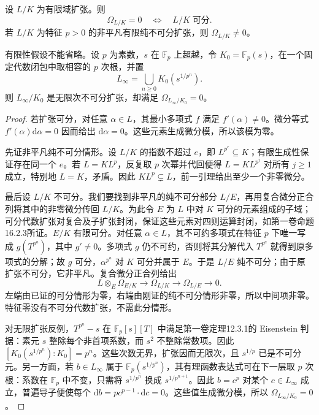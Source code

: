 \begin{theorem}\label{b3:thm:finite-field-differentials-separable}
	设 \(L/K\) 为有限域扩张。则
	\[
		\Omega_{L/K}=0\quad\Longleftrightarrow\quad L/K\;\text{可分}.
	\]
	若 \(L/K\) 为特征 \(p>0\) 的非平凡有限纯不可分扩张，则 \(\Omega_{L/K}\ne0\)。

	有限性假设不能省略。设 \(p\) 为素数，\(s\) 在 \(\mathbb F_p\) 上超越，令 \(K_0=\mathbb F_p(s)\)，在一个固定代数闭包中取相容的 \(p\) 次根，并置
	\[
		L_\infty=\bigcup_{n\ge0}K_0(s^{1/p^n}).
	\]
	则 \(L_\infty/K_0\) 是无限次不可分扩张，却满足 \(\Omega_{L_\infty/K_0}=0\)。
\end{theorem}
\begin{proof}
	若扩张可分，对任意 \(\alpha\in L\)，其最小多项式 \(f\) 满足 \(f'(\alpha)\ne0\)。微分等式 \(f'(\alpha)\mathrm{d}\alpha=0\) 因而给出 \(\mathrm{d}\alpha=0\)。这些元素生成微分模，所以该模为零。

	先证非平凡纯不可分情形。设 \(L/K\) 的指数不超过 \(e\)，即 \(L^{p^e}\subseteq K\)；有限生成性保证存在同一个 \(e\)。若 \(L=K L^p\)，反复取 \(p\) 次幂并代回便得 \(L=K L^{p^j}\) 对所有 \(j\ge1\) 成立，特别地 \(L=K\)，矛盾。因此 \(K L^p\subsetneq L\)，前一引理给出至少一个非零微分。

	最后设 \(L/K\) 不可分。我们要找到非平凡的纯不可分部分 \(L/E\)，再用复合微分正合列将其中的非零微分传回 \(L/K\)。为此令 \(E\) 为 \(L\) 中对 \(K\) 可分的元素组成的子域；可分代数扩张对复合及子扩张封闭，保证这些元素对四则运算封闭，如第一卷命题16.2.3所证。\(E/K\) 有限可分。对任意 \(\alpha\in L\)，其不可约多项式在特征 \(p\) 下唯一写成 \(g(T^{p^a})\)，其中 \(g'\ne0\)。多项式 \(g\) 仍不可约，否则将其分解代入 \(T^{p^a}\) 就得到原多项式的分解；故 \(g\) 可分，\(\alpha^{p^a}\) 对 \(K\) 可分并属于 \(E\)。于是 \(L/E\) 纯不可分；由于原扩张不可分，它非平凡。复合微分正合列给出
	\[
		L\otimes_E\Omega_{E/K}\longrightarrow\Omega_{L/K} \longrightarrow\Omega_{L/E}\longrightarrow0.
	\]
	左端由已证的可分情形为零，右端由刚证的纯不可分情形非零，所以中间项非零。特征零没有不可分代数扩张，不需此分情形。

	对无限扩张反例，\(T^{p^n}-s\) 在 \(\mathbb F_p[s][T]\) 中满足第一卷定理12.3.1的 Eisenstein 判据：素元 \(s\) 整除每个非首项系数，而 \(s^2\) 不整除常数项。因此 \([K_0(s^{1/p^n}):K_0]=p^n\)。这些次数无界，扩张因而无限次，且 \(s^{1/p}\) 已是不可分元。另一方面，若 \(b\in L_\infty\) 属于 \(\mathbb F_p(s^{1/p^n})\)，其有理函数表达式可在下一层取 \(p\) 次根：系数在 \(\mathbb F_p\) 中不变，只需将 \(s^{1/p^n}\) 换成 \(s^{1/p^{n+1}}\)。因此 \(b=c^p\) 对某个 \(c\in L_\infty\) 成立，普遍导子便使每个 \(\mathrm{d}b=p c^{p-1}\cdot\mathrm{d}c=0\)。这些值生成微分模，所以 \(\Omega_{L_\infty/K_0}=0\)。
\end{proof}

